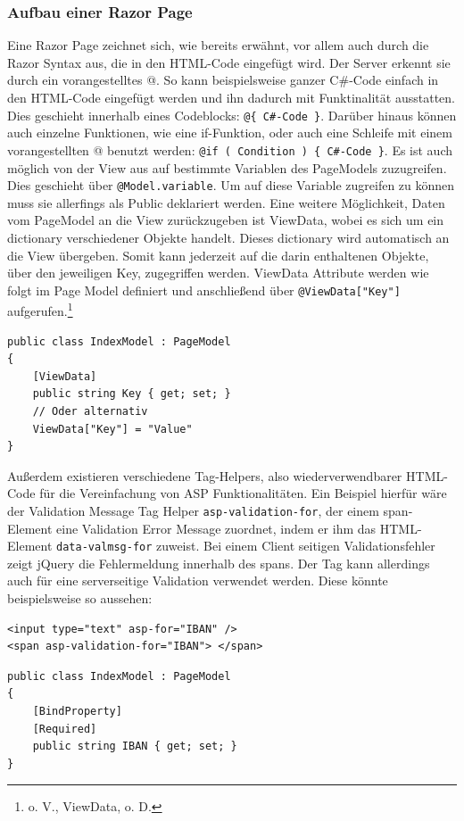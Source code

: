\documentclass[a4paper,
12pt,
oneside]
{article}
\begin{document}
	\subsubsection{Aufbau einer Razor Page}
	Eine Razor Page zeichnet sich, wie bereits erwähnt, vor allem auch durch die Razor Syntax aus, die in den HTML-Code eingefügt wird. Der Server erkennt sie durch ein vorangestelltes \glqq @\grqq. So kann beispielsweise ganzer C\#-Code einfach in den HTML-Code eingefügt werden und ihn dadurch mit Funktinalität ausstatten. Dies geschieht innerhalb eines Codeblocks: \texttt{@\{ C\#-Code \}}. Darüber hinaus können auch einzelne Funktionen, wie eine if-Funktion, oder auch eine Schleife mit einem vorangestellten @ benutzt werden: \texttt{@if ( Condition ) \{ C\#-Code \}}. Es ist auch möglich von der View aus auf bestimmte Variablen des PageModels zuzugreifen. Dies geschieht über \texttt{@Model.variable}. Um auf diese Variable zugreifen zu können muss sie allerfings als Public deklariert werden. Eine weitere Möglichkeit, Daten vom PageModel an die View zurückzugeben ist ViewData, wobei es sich um ein dictionary verschiedener Objekte handelt. Dieses dictionary wird automatisch an die View übergeben. Somit kann jederzeit auf die darin enthaltenen Objekte, über den jeweiligen Key, zugegriffen werden. ViewData Attribute werden wie folgt im Page Model definiert und anschließend über \texttt{@ViewData["Key"]} aufgerufen.\footnote{o. V., ViewData, o. D.}
	\lstset{style=csharp}
	\begin{lstlisting}
public class IndexModel : PageModel
{
	[ViewData]
	public string Key { get; set; }
	// Oder alternativ
	ViewData["Key"] = "Value"
}
	\end{lstlisting}
	Außerdem existieren verschiedene Tag-Helpers, also wiederverwendbarer HTML-Code für die Vereinfachung von ASP Funktionalitäten. Ein Beispiel hierfür wäre der Validation Message Tag Helper \texttt{asp-validation-for}, der einem span-Element eine Validation Error Message zuordnet, indem er ihm das HTML-Element \texttt{data-valmsg-for} zuweist. Bei einem Client seitigen Validationsfehler zeigt jQuery die Fehlermeldung innerhalb des spans. Der Tag kann allerdings auch für eine serverseitige Validation verwendet werden. Diese könnte beispielsweise so aussehen: 
	\lstset{style=cshtml}
	\begin{lstlisting}
<input type="text" asp-for="IBAN" />
<span asp-validation-for="IBAN"> </span>
	\end{lstlisting}
	\lstset{style=csharp}
	\begin{lstlisting}
public class IndexModel : PageModel
{
	[BindProperty]
	[Required]
	public string IBAN { get; set; }
}
	\end{lstlisting}
\end{document}
